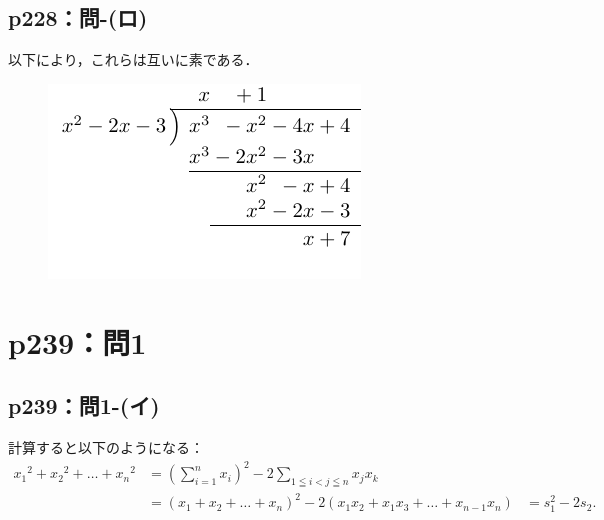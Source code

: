 \documentclass[a4paper,10pt,fleqn]{ltjsarticle}
\begin{document}
\subsection*{p228：問-(ロ)}

以下により，これらは互いに素である．

\begin{figure}[ht]
    \centering
    \includegraphics{emath_figures/p228_toi_ro.pdf}
\end{figure}

\newpage

\section*{p239：問1}

\subsection*{p239：問1-(イ)}


\begin{tleftbar}
    計算すると以下のようになる：
    \begin{align*}
        {x_1}^2 + {x_2}^2+\dots+{x_n}^2 & = \left (\sum_{i=1}^{n} x_i \right )^2 - 2\sum_{1\leqq i < j \leqq n} x_j x_k \\
                                        & = (x_1+x_2+\dots+x_n)^2 - 2(x_1 x_2 + x_1 x_3 + \dots + x_{n-1} x_n)
                                        & = s_1^2 - 2s_2.
    \end{align*}
\end{tleftbar}
\end{document}
